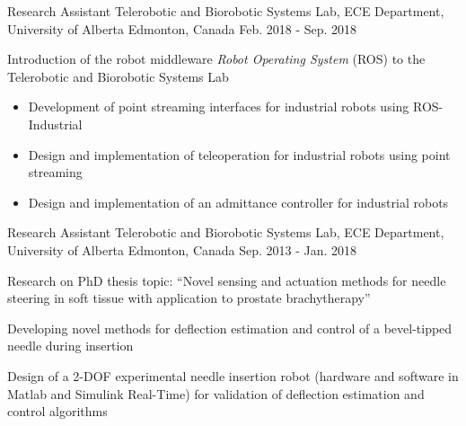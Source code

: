 \begin{cventries}
  \cventry
    {Research Assistant} %
    {Telerobotic and Biorobotic Systems Lab, ECE Department, University of Alberta} %
    {Edmonton, Canada} %
    {Feb. 2018 - Sep. 2018} %
    {
      \begin{cvitems}
        \item {Introduction of the robot middleware \emph{Robot Operating System} (ROS) to the Telerobotic and Biorobotic Systems Lab}
        \begin{itemize}
          \item {Development of point streaming interfaces for industrial robots using ROS-Industrial}
          \item {Design and implementation of teleoperation for industrial robots using point streaming}
          \item {Design and implementation of an admittance controller for industrial robots}
        \end{itemize}
      \end{cvitems}
    }

  \cventry
    {Research Assistant} %
    {Telerobotic and Biorobotic Systems Lab, ECE Department, University of Alberta} %
    {Edmonton, Canada} %
    {Sep. 2013 - Jan. 2018} %
    {
      \begin{cvitems} %
        \item{Research on PhD thesis topic: ``Novel sensing and actuation methods for needle steering in soft tissue with application to prostate brachytherapy''}
        \item{Developing novel methods for deflection estimation and control of a bevel-tipped needle during insertion}
        \item{Design of a 2-DOF experimental needle insertion robot (hardware and software in Matlab and Simulink Real-Time) for validation of deflection estimation and control algorithms}
      \end{cvitems}
    }


\end{cventries}
